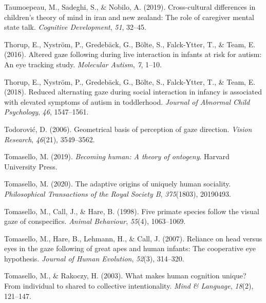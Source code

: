 \documentclass[
  man,floatsintext]{apa7}
\newlength{\cslhangindent}
\newlength{\cslentryspacingunit} %
\newenvironment{CSLReferences}[2] %
 {%
  \setlength{\parindent}{0pt}
  \ifodd #1
  \let\oldpar\par
  \def\par{\hangindent=\cslhangindent\oldpar}
  \fi
  \setlength{\parskip}{#2\cslentryspacingunit}
 }%
 {}
\begin{document}
\begin{CSLReferences}{1}{0}
\leavevmode{}%
Taumoepeau, M., Sadeghi, S., \& Nobilo, A. (2019). Cross-cultural differences in children's theory of mind in iran and new zealand: The role of caregiver mental state talk. \emph{Cognitive Development}, \emph{51}, 32--45.

\leavevmode{}%
Thorup, E., Nyström, P., Gredebäck, G., Bölte, S., Falck-Ytter, T., \& Team, E. (2016). Altered gaze following during live interaction in infants at risk for autism: An eye tracking study. \emph{Molecular Autism}, \emph{7}, 1--10.

\leavevmode{}%
Thorup, E., Nyström, P., Gredebäck, G., Bölte, S., Falck-Ytter, T., \& Team, E. (2018). Reduced alternating gaze during social interaction in infancy is associated with elevated symptoms of autism in toddlerhood. \emph{Journal of Abnormal Child Psychology}, \emph{46}, 1547--1561.

\leavevmode{}%
Todorović, D. (2006). Geometrical basis of perception of gaze direction. \emph{Vision Research}, \emph{46}(21), 3549--3562.

\leavevmode{}%
Tomasello, M. (2019). \emph{Becoming human: A theory of ontogeny}. Harvard University Press.

\leavevmode{}%
Tomasello, M. (2020). The adaptive origins of uniquely human sociality. \emph{Philosophical Transactions of the Royal Society B}, \emph{375}(1803), 20190493.

\leavevmode{}%
Tomasello, M., Call, J., \& Hare, B. (1998). Five primate species follow the visual gaze of conspecifics. \emph{Animal Behaviour}, \emph{55}(4), 1063--1069.

\leavevmode{}%
Tomasello, M., Hare, B., Lehmann, H., \& Call, J. (2007). Reliance on head versus eyes in the gaze following of great apes and human infants: The cooperative eye hypothesis. \emph{Journal of Human Evolution}, \emph{52}(3), 314--320.

\leavevmode{}%
Tomasello, M., \& Rakoczy, H. (2003). What makes human cognition unique? From individual to shared to collective intentionality. \emph{Mind \& Language}, \emph{18}(2), 121--147.


\end{CSLReferences}
\end{document}
